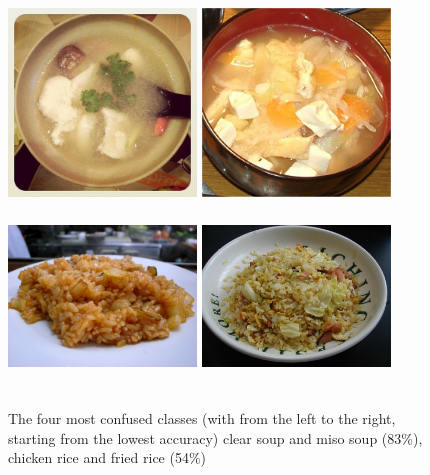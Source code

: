 \begin{figure}
    \centering
    \includegraphics[height=5cm, width=5cm]{img/confusing_clear_soup.jpg}
    \includegraphics[height=5cm, width=5cm]{img/confusing_miso_soup.jpg}
    \includegraphics[height=5cm, width=5cm]{img/confusing_chicken_rice.jpg}
    \includegraphics[height=5cm, width=5cm]{img/confusing_fried_rice.jpg}
    \caption[Most confused classes]{The four most confused classes (with from the left to the right, starting from the lowest accuracy) clear soup and miso soup (83\%), chicken rice and fried rice (54\%)}
    \label{fig:confusing_4}
\end{figure}

